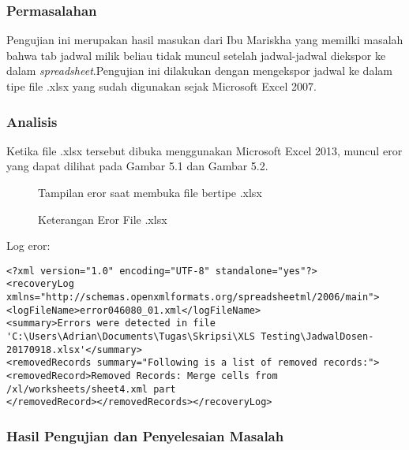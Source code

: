 \subsubsection{Permasalahan}
Pengujian ini merupakan hasil masukan dari Ibu Mariskha yang memilki masalah bahwa tab jadwal milik beliau tidak muncul setelah jadwal-jadwal diekspor ke dalam \textit{spreadsheet}.Pengujian ini dilakukan dengan mengekspor jadwal ke dalam tipe file .xlsx yang sudah digunakan sejak Microsoft Excel 2007.
\subsubsection{Analisis}
Ketika file .xlsx tersebut dibuka menggunakan Microsoft Excel 2013, muncul eror yang dapat dilihat pada Gambar 5.1 dan Gambar 5.2.
\begin{figure} [H]
	\centering  
	\caption[Tampilan eror saat membuka file bertipe .xlsx]{Tampilan eror saat membuka file bertipe .xlsx} 
	\label{fig:flow-chart-CodeIgniter} 
\end{figure}

\begin{figure} [H]
	\centering  
	\caption[Keterangan Eror File .xlsx]{Keterangan Eror File .xlsx} 
	\label{fig:flow-chart-CodeIgniter} 
\end{figure}

Log eror:
\begin{lstlisting}
<?xml version="1.0" encoding="UTF-8" standalone="yes"?>
<recoveryLog xmlns="http://schemas.openxmlformats.org/spreadsheetml/2006/main">
<logFileName>error046080_01.xml</logFileName>
<summary>Errors were detected in file 'C:\Users\Adrian\Documents\Tugas\Skripsi\XLS Testing\JadwalDosen-20170918.xlsx'</summary>
<removedRecords summary="Following is a list of removed records:"><removedRecord>Removed Records: Merge cells from /xl/worksheets/sheet4.xml part
</removedRecord></removedRecords></recoveryLog>
\end{lstlisting}

\subsubsection{Hasil Pengujian dan Penyelesaian Masalah} 
